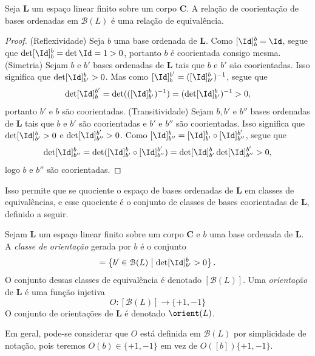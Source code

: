 \begin{prop}
Seja $\bm L$ um espaço linear finito sobre um corpo $\bm C$. A relação de coorientação de bases ordenadas em $\mathcal{B}(L)$ é uma relação de equivalência.
\end{prop}
\begin{proof}
(Reflexividade) Seja $b$ uma base ordenada de $\bm L$. Como $[\Id]^b_b = \Id$, segue que $\det [\Id]^b_b = \det \Id = 1 >0$, portanto $b$ é coorientada consigo mesma.
(Simetria) Sejam $b$ e $b'$ bases ordenadas de $\bm L$ tais que $b$ e $b'$ são coorientadas. Isso significa que $\det [\Id]^b_{b'} >0$. Mas como $[\Id]_b^{b'} = ([\Id]^b_{b'})\inv$, segue que
	\begin{equation*}
	\det [\Id]_b^{b'} = \det(([\Id]^b_{b'})\inv) = (\det [\Id]^b_{b'})\inv > 0,
	\end{equation*}
portanto $b'$ e $b$ são coorientadas.
(Transitividade) Sejam $b,b'$ e $b''$ bases ordenadas de $\bm L$ tais que $b$ e $b'$ são coorientadas e $b'$ e $b''$ são coorientadas. Isso significa que $\det [\Id]^b_{b'} > 0$ e $\det [\Id]^{b'}_{b''} > 0$. Como $[\Id]^b_{b''} = [\Id]^b_{b'} \circ [\Id]^{b'}_{b''}$, segue que
	\begin{equation*}
	\det [\Id]^b_{b''} = \det ( [\Id]^b_{b'} \circ [\Id]^{b'}_{b''}) = \det  [\Id]^b_{b'} \det [\Id]^{b'}_{b''} > 0,
	\end{equation*}
logo $b$ e $b''$ são coorientadas.
\end{proof}

Isso permite que se quociente o espaço de bases ordenadas de $\bm L$ em classes de equivalências, e esse quociente é o conjunto de classes de bases coorientadas de $\bm L$, definido a seguir.

\begin{defi}
Sejam $\bm L$ um espaço linear finito sobre um corpo $\bm C$ e $b$ uma base ordenada de $\bm L$. A \emph{classe de orientação} gerada por $b$ é o conjunto
	\begin{equation*}
	[b] = \set{b' \in \mathcal{B}(L)}{\det [\Id]^b_{b'} > 0}.
	\end{equation*}
O conjunto dessas classes de equivalência é denotado $[\mathcal{B}(L)]$. Uma \emph{orientação} de $\bm L$ é uma função injetiva
	\begin{equation*}
	O\colon [\mathcal{B}(L)] \to \{+1,-1\}
	\end{equation*}
O conjunto de orientações de $\bm L$ é denotado $\orient(L)$.
\end{defi}

Em geral, pode-se considerar que $O$ está definida em $\mathcal{B}(L)$ por simplicidade de notação, pois teremos $O(b) \in \{+1,-1\}$ em vez de $O([b])\{+1,-1\}$.

